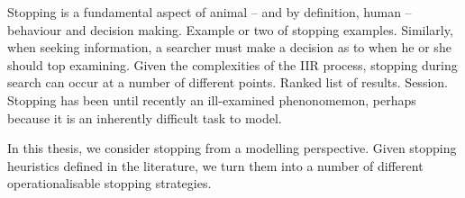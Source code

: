 
\begin{preamble}
{}

Stopping is a fundamental aspect of animal -- and by definition, human -- behaviour and decision making.
Example or two of stopping examples.
Similarly, when seeking information, a searcher must make a decision as to when he or she should top examining.
Given the complexities of the IIR process, stopping during search can occur at a number of different points.
Ranked list of results.
Session.
Stopping has been until recently an ill-examined phenonomemon, perhaps because it is an inherently difficult task to model.

In this thesis, we consider stopping from a modelling perspective.
Given stopping heuristics defined in the literature, we turn them into a number of different operationalisable stopping strategies.



\end{preamble}
